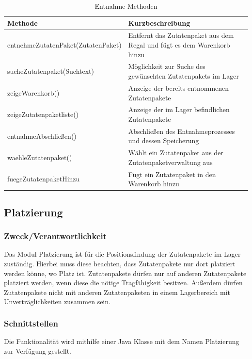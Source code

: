 \begin{table}[h]
    \centering
    \begin{tabularx}{\textwidth}{ l|X }
        \textbf{Methode} & \textbf{Kurzbeschreibung}\\
        \hline
        entnehmeZutatenPaket(ZutatenPaket) & Entfernt das Zutatenpaket aus dem Regal und fügt es dem Warenkorb hinzu\\
        \hline
        sucheZutatenpaket(Suchtext) & Möglichkeit zur Suche des gewünschten Zutatenpakets im Lager\\
        \hline
        zeigeWarenkorb() & Anzeige der bereits entnommenen Zutatenpakete\\
        \hline
        zeigeZutatenpaketliste() & Anzeige der im Lager befindlichen Zutatenpakete\\
        \hline
        entnahmeAbschließen() & Abschließen des Entnahmeprozesses und dessen Speicherung\\
        \hline
        waehleZutatenpaket() & Wählt ein Zutatenpaket aus der Zutatenpaketverwaltung aus\\
        \hline
        fuegeZutatenpaketHinzu & Fügt ein Zutatenpaket in den Warenkorb hinzu\\
    \end{tabularx}
    \caption{Entnahme Methoden}
    \label{tab:Entnahme_Methoden}
\end{table}

\subsection{Platzierung}\label{subsec:platzierung}

\subsubsection{Zweck/Verantwortlichkeit}
Das Modul Platzierung ist für die Positionsfindung der Zutatenpakete im Lager zuständig. Hierbei muss diese
beachten, dass Zutatenpakete nur dort platziert werden könne, wo Platz ist. Zutatenpakete dürfen nur auf anderen
Zutatenpakete platziert werden, wenn diese die nötige Tragfähigkeit besitzen. Außerdem dürfen Zutatenpakete nicht
mit anderen Zutatenpaketen in einem Lagerbereich mit Unverträglichkeiten zusammen sein.
\subsubsection{Schnittstellen}
Die Funktionalität wird mithilfe einer Java Klasse mit dem Namen Platzierung zur Verfügung gestellt.

